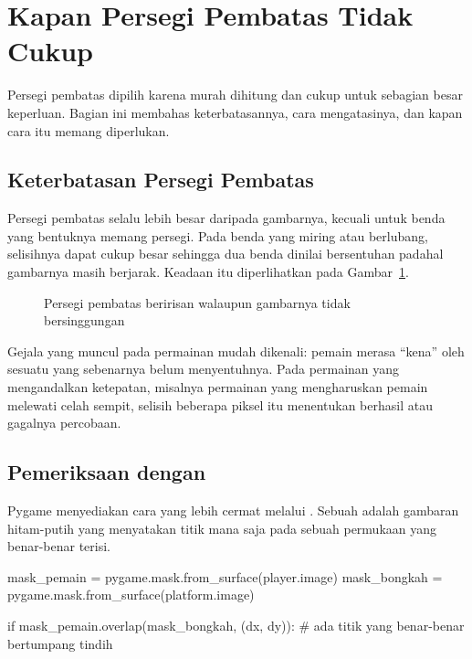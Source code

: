\section{Kapan Persegi Pembatas Tidak Cukup}
\label{sec:mask}

Persegi pembatas dipilih karena murah dihitung dan cukup untuk sebagian besar
keperluan. Bagian ini membahas keterbatasannya, cara mengatasinya, dan kapan
cara itu memang diperlukan.

\subsection{Keterbatasan Persegi Pembatas}

Persegi pembatas selalu lebih besar daripada gambarnya, kecuali untuk benda
yang bentuknya memang persegi. Pada benda yang miring atau berlubang,
selisihnya dapat cukup besar sehingga dua benda dinilai bersentuhan padahal
gambarnya masih berjarak. Keadaan itu diperlihatkan pada
Gambar~\ref{fig:aabb-mask}.

\begin{figure}[htbp]
\centering

\caption{Persegi pembatas beririsan walaupun gambarnya tidak bersinggungan}
\label{fig:aabb-mask}
\end{figure}

Gejala yang muncul pada permainan mudah dikenali: pemain merasa ``kena'' oleh
sesuatu yang sebenarnya belum menyentuhnya. Pada permainan yang mengandalkan
ketepatan, misalnya permainan yang mengharuskan pemain melewati celah sempit,
selisih beberapa piksel itu menentukan berhasil atau gagalnya percobaan.

\subsection{Pemeriksaan dengan }

Pygame menyediakan cara yang lebih cermat melalui . Sebuah
 adalah gambaran hitam-putih yang menyatakan titik mana saja
pada sebuah permukaan yang benar-benar terisi.

\begin{kodekeluaran}
mask_pemain = pygame.mask.from_surface(player.image)
mask_bongkah = pygame.mask.from_surface(platform.image)

if mask_pemain.overlap(mask_bongkah, (dx, dy)):
    # ada titik yang benar-benar bertumpang tindih
\end{kodekeluaran}

